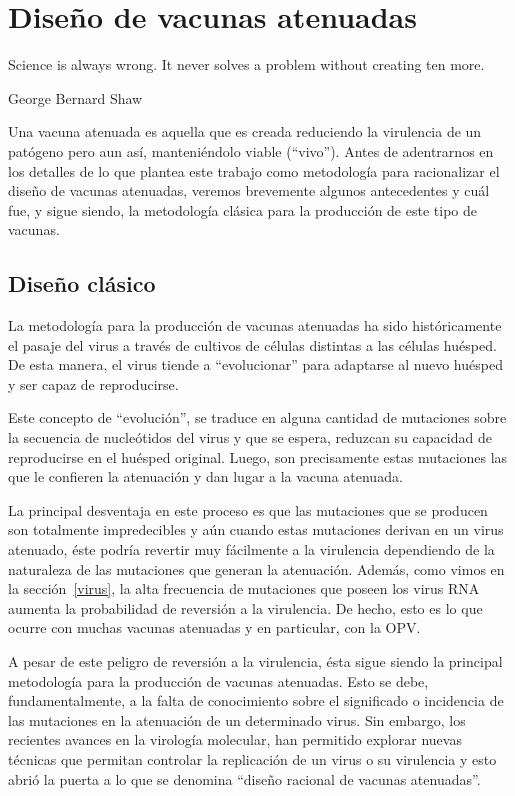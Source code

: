 \chapter{Dise\~no de vacunas atenuadas}
\label{diseno}
\epigraph{Science is always wrong. It never solves a problem without creating
ten more.}%
{George Bernard Shaw}

Una vacuna atenuada es aquella que es creada reduciendo la virulencia de un
pat\'ogeno pero aun as\'i, manteni\'endolo viable (``vivo''). Antes de
adentrarnos en los detalles de lo que plantea este trabajo como metodolog\'ia
para racionalizar el dise\~no de vacunas atenuadas, veremos brevemente algunos
antecedentes y cu\'al fue, y sigue siendo, la metodolog\'ia cl\'asica para la
producci\'on de este tipo de vacunas.

\section{Dise\~no cl\'asico}

La metodolog\'ia para la producci\'on de vacunas atenuadas ha sido
hist\'oricamente el pasaje del virus a trav\'es de cultivos de c\'elulas
distintas a las c\'elulas hu\'esped. De esta manera, el virus tiende a
``evolucionar'' para adaptarse al nuevo hu\'esped y ser capaz de reproducirse.

Este concepto de ``evoluci\'on'', se traduce en alguna cantidad de mutaciones
sobre la secuencia de nucle\'otidos del virus y que se espera, reduzcan su
capacidad de reproducirse en el hu\'esped original. Luego, son precisamente
estas mutaciones las que le confieren la atenuaci\'on y dan lugar a la vacuna
atenuada.

La principal desventaja en este proceso es que las mutaciones que se producen
son totalmente impredecibles y a\'un cuando estas mutaciones derivan en un
virus atenuado, \'este podr\'ia revertir muy f\'acilmente a la virulencia
dependiendo de la naturaleza de las mutaciones que generan la
atenuaci\'on\cite{Badgett02}.
Adem\'as, como vimos en la secci\'on~\ref{virus}, la alta frecuencia de
mutaciones que poseen los virus \ac{RNA} aumenta la probabilidad de reversi\'on
a la virulencia. De hecho, esto es lo que ocurre con muchas vacunas atenuadas y
en particular, con la \ac{OPV}.

A pesar de este peligro de reversi\'on a la virulencia, \'esta sigue siendo la
principal metodolog\'ia para la producci\'on de vacunas atenuadas. Esto se debe,
fundamentalmente, a la falta de conocimiento sobre el significado o incidencia
de las mutaciones en la atenuaci\'on de un determinado virus. Sin embargo, los
recientes avances en la virolog\'ia molecular, han permitido explorar nuevas
t\'ecnicas que permitan controlar la replicaci\'on de un virus o su virulencia y
esto abri\'o la puerta a lo que se denomina ``dise\~no racional de vacunas
atenuadas''\cite{Lauring10}.

